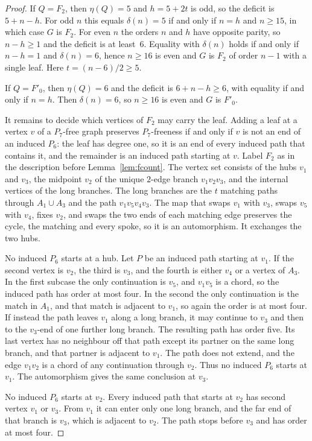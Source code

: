 \documentclass[ASNA]{USG}
\theoremstyle{WBstyletwo}
\numberwithin{equation}{section}
\begin{document}
\begin{proof}
If $Q=F_2$, then $\eta(Q)=5$ and $h=5+2t$ is odd, so the deficit is $5+n-h$. For odd $n$ this equals $\delta(n)=5$ if and only if $n=h$ and $n\ge 15$, in which case $G$ is $F_2$. For even $n$ the orders $n$ and $h$ have opposite parity, so $n-h\ge 1$ and the deficit is at least~$6$. Equality with $\delta(n)$ holds if and only if $n-h=1$ and $\delta(n)=6$, hence $n\ge 16$ is even and $G$ is $F_2$ of order $n-1$ with a single leaf. Here $t=(n-6)/2\ge 5$.

If $Q=F'_0$, then $\eta(Q)=6$ and the deficit is $6+n-h\ge 6$, with equality if and only if $n=h$. Then $\delta(n)=6$, so $n\ge 16$ is even and $G$ is $F'_0$.

It remains to decide which vertices of $F_2$ may carry the leaf. Adding a leaf at a vertex $v$ of a $P_7$-free graph preserves $P_7$-freeness if and only if $v$ is not an end of an induced $P_6$: the leaf has degree one, so it is an end of every induced path that contains it, and the remainder is an induced path starting at $v$. Label $F_2$ as in the description before Lemma~\ref{lem:fcount}. The vertex set consists of the hubs $v_1$ and $v_3$, the midpoint $v_2$ of the unique $2$-edge branch $v_1v_2v_3$, and the internal vertices of the long branches. The long branches are the $t$ matching paths through $A_1\cup A_3$ and the path $v_1v_5v_4v_3$. The map that swaps $v_1$ with $v_3$, swaps $v_5$ with $v_4$, fixes $v_2$, and swaps the two ends of each matching edge preserves the cycle, the matching and every spoke, so it is an automorphism. It exchanges the two hubs.

No induced $P_6$ starts at a hub. Let $P$ be an induced path starting at $v_1$. If the second vertex is $v_2$, the third is $v_3$, and the fourth is either $v_4$ or a vertex of $A_3$. In the first subcase the only continuation is $v_5$, and $v_1v_5$ is a chord, so the induced path has order at most four. In the second the only continuation is the match in $A_1$, and that match is adjacent to $v_1$, so again the order is at most four. If instead the path leaves $v_1$ along a long branch, it may continue to $v_3$ and then to the $v_3$-end of one further long branch. The resulting path has order five. Its last vertex has no neighbour off that path except its partner on the same long branch, and that partner is adjacent to $v_1$. The path does not extend, and the edge $v_1v_2$ is a chord of any continuation through $v_2$. Thus no induced $P_6$ starts at $v_1$. The automorphism gives the same conclusion at $v_3$.

No induced $P_6$ starts at $v_2$. Every induced path that starts at $v_2$ has second vertex $v_1$ or $v_3$. From $v_1$ it can enter only one long branch, and the far end of that branch is $v_3$, which is adjacent to $v_2$. The path stops before $v_3$ and has order at most four.


\end{proof}
\end{document}
